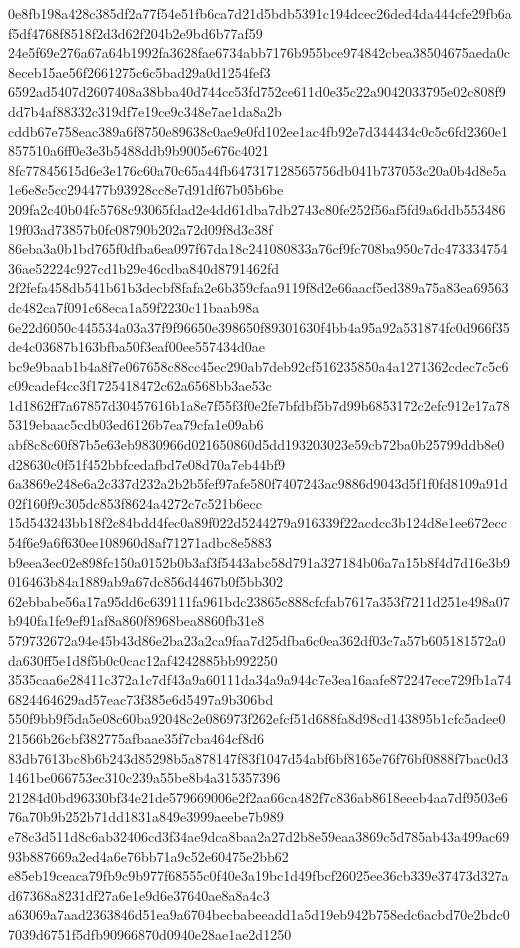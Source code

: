 \documentclass[11pt,a4paper]{article}
\begin{document}
{0e8fb198a428c385df2a77f54e51fb6ca7d21d5bdb5391c194dcec26ded4da444cfe29fb6af5df4768f8518f2d3d62f204b2e9bd6b77af59
24e5f69e276a67a64b1992fa3628fae6734abb7176b955bce974842cbea38504675aeda0c8eceb15ae56f2661275c6c5bad29a0d1254fef3
6592ad5407d2607408a38bba40d744cc53fd752ce611d0e35c22a9042033795e02c808f9dd7b4af88332c319df7e19ce9c348e7ae1da8a2b
cddb67e758eac389a6f8750e89638c0ae9e0fd102ee1ac4fb92e7d344434c0c5c6fd2360e1857510a6ff0e3e3b5488ddb9b9005e676c4021
8fc77845615d6e3e176c60a70c65a44fb647317128565756db041b737053c20a0b4d8e5a1e6e8c5cc294477b93928cc8e7d91df67b05b6be
209fa2c40b04fc5768c93065fdad2e4dd61dba7db2743c80fe252f56af5fd9a6ddb55348619f03ad73857b0fc08790b202a72d09f8d3c38f
86eba3a0b1bd765f0dfba6ea097f67da18c241080833a76cf9fc708ba950c7dc47333475436ae52224c927cd1b29e46cdba840d8791462fd
2f2fefa458db541b61b3decbf8fafa2e6b359cfaa9119f8d2e66aacf5ed389a75a83ea69563dc482ca7f091c68eca1a59f2230c11baab98a
6e22d6050c445534a03a37f9f96650e398650f89301630f4bb4a95a92a531874fc0d966f35de4c03687b163bfba50f3eaf00ee557434d0ae
bc9e9baab1b4a8f7e067658c88cc45ec290ab7deb92cf516235850a4a1271362cdec7c5c6c09cadef4cc3f1725418472c62a6568bb3ae53c
1d1862ff7a67857d30457616b1a8e7f55f3f0e2fe7bfdbf5b7d99b6853172c2efc912e17a785319ebaac5cdb03ed6126b7ea79cfa1e09ab6
abf8c8c60f87b5e63eb9830966d021650860d5dd193203023e59cb72ba0b25799ddb8e0d28630c0f51f452bbfcedafbd7e08d70a7eb44bf9
6a3869e248e6a2c337d232a2b2b5fef97afe580f7407243ac9886d9043d5f1f0fd8109a91d02f160f9c305dc853f8624a4272c7c521b6ecc
15d543243bb18f2c84bdd4fec0a89f022d5244279a916339f22acdcc3b124d8e1ee672ecc54f6e9a6f630ee108960d8af71271adbc8e5883
b9eea3ec02e898fc150a0152b0b3af3f5443abc58d791a327184b06a7a15b8f4d7d16e3b9016463b84a1889ab9a67dc856d4467b0f5bb302
62ebbabe56a17a95dd6c639111fa961bdc23865c888cfcfab7617a353f7211d251e498a07b940fa1fe9ef91af8a860f8968bea8860fb31e8
579732672a94e45b43d86e2ba23a2ca9faa7d25dfba6c0ea362df03c7a57b605181572a0da630ff5e1d8f5b0c0cac12af4242885bb992250
3535caa6e28411c372a1c7df43a9a60111da34a9a944c7e3ea16aafe872247ece729fb1a746824464629ad57eac73f385e6d5497a9b306bd
550f9bb9f5da5e08c60ba92048c2e086973f262efcf51d688fa8d98cd143895b1cfc5adee021566b26cbf382775afbaae35f7cba464cf8d6
83db7613bc8b6b243d85298b5a878147f83f1047d54abf6bf8165e76f76bf0888f7bac0d31461be066753ec310c239a55be8b4a315357396
21284d0bd96330bf34e21de579669006e2f2aa66ca482f7c836ab8618eeeb4aa7df9503e676a70b9b252b71dd1831a849e3999aeebe7b989
e78c3d511d8c6ab32406cd3f34ae9dca8baa2a27d2b8e59eaa3869c5d785ab43a499ac6993b887669a2ed4a6e76bb71a9c52e60475e2bb62
e85eb19ceaca79fb9c9b977f68555c0f40e3a19bc1d49fbcf26025ee36cb339e37473d327ad67368a8231df27a6e1e9d6e37640ae8a8a4c3
a63069a7aad2363846d51ea9a6704becbabeeadd1a5d19eb942b758edc6acbd70e2bdc07039d6751f5dfb90966870d0940e28ae1ae2d1250
}
\end{document}
